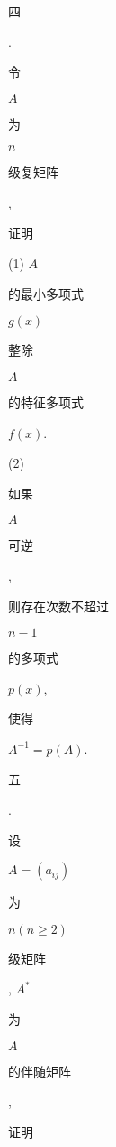 \documentclass[10pt]{article}
\begin{document}
\begin{CJK}{UTF8}{mj}四\end{CJK}. \begin{CJK}{UTF8}{mj}令\end{CJK} $A$ \begin{CJK}{UTF8}{mj}为\end{CJK} $n$ \begin{CJK}{UTF8}{mj}级复矩阵\end{CJK}, \begin{CJK}{UTF8}{mj}证明\end{CJK}

(1) $A$ \begin{CJK}{UTF8}{mj}的最小多项式\end{CJK} $g(x)$ \begin{CJK}{UTF8}{mj}整除\end{CJK} $A$ \begin{CJK}{UTF8}{mj}的特征多项式\end{CJK} $f(x)$.

(2) \begin{CJK}{UTF8}{mj}如果\end{CJK} $A$ \begin{CJK}{UTF8}{mj}可逆\end{CJK}, \begin{CJK}{UTF8}{mj}则存在次数不超过\end{CJK} $n-1$ \begin{CJK}{UTF8}{mj}的多项式\end{CJK} $p(x)$, \begin{CJK}{UTF8}{mj}使得\end{CJK} $A^{-1}=p(A)$.

\begin{CJK}{UTF8}{mj}五\end{CJK}. \begin{CJK}{UTF8}{mj}设\end{CJK} $A=\left(a_{i j}\right)$ \begin{CJK}{UTF8}{mj}为\end{CJK} $n(n \geqslant 2)$ \begin{CJK}{UTF8}{mj}级矩阵\end{CJK}, $A^{*}$ \begin{CJK}{UTF8}{mj}为\end{CJK} $A$ \begin{CJK}{UTF8}{mj}的伴随矩阵\end{CJK}, \begin{CJK}{UTF8}{mj}证明\end{CJK}
\end{document}
